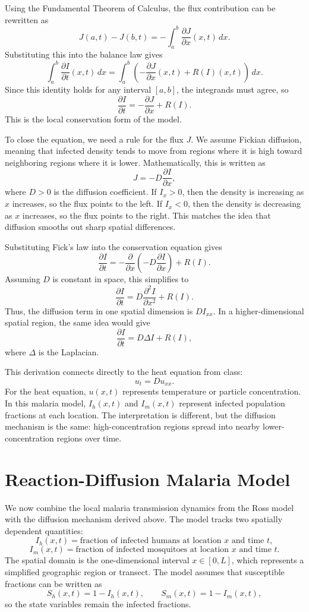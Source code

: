 \documentclass[12pt]{article}
\begin{document}
Using the Fundamental Theorem of Calculus, the flux contribution can be rewritten as
\[
J(a,t)-J(b,t)
=
-\int_a^b \frac{\partial J}{\partial x}(x,t)\,dx.
\]
Substituting this into the balance law gives
\[
\int_a^b \frac{\partial I}{\partial t}(x,t)\,dx
=
\int_a^b \left(-\frac{\partial J}{\partial x}(x,t)+R(I)(x,t)\right)\,dx.
\]
Since this identity holds for any interval \([a,b]\), the integrands must agree, so
\[
\frac{\partial I}{\partial t}
=
-\frac{\partial J}{\partial x}+R(I).
\]
This is the local conservation form of the model.

To close the equation, we need a rule for the flux \(J\). We assume Fickian diffusion, meaning that infected density tends to move from regions where it is high toward neighboring regions where it is lower. Mathematically, this is written as
\[
J=-D\frac{\partial I}{\partial x},
\]
where \(D>0\) is the diffusion coefficient. If \(I_x>0\), then the density is increasing as \(x\) increases, so the flux points to the left. If \(I_x<0\), then the density is decreasing as \(x\) increases, so the flux points to the right. This matches the idea that diffusion smooths out sharp spatial differences.

Substituting Fick's law into the conservation equation gives
\[
\frac{\partial I}{\partial t}
=
-\frac{\partial}{\partial x}\left(-D\frac{\partial I}{\partial x}\right)+R(I).
\]
Assuming \(D\) is constant in space, this simplifies to
\[
\frac{\partial I}{\partial t}
=
D\frac{\partial^2 I}{\partial x^2}+R(I).
\]
Thus, the diffusion term in one spatial dimension is \(D I_{xx}\). In a higher-dimensional spatial region, the same idea would give
\[
\frac{\partial I}{\partial t}
=
D\Delta I+R(I),
\]
where \(\Delta\) is the Laplacian.

This derivation connects directly to the heat equation from class:
\[
u_t=Du_{xx}.
\]
For the heat equation, \(u(x,t)\) represents temperature or particle concentration. In this malaria model, \(I_h(x,t)\) and \(I_m(x,t)\) represent infected population fractions at each location. The interpretation is different, but the diffusion mechanism is the same: high-concentration regions spread into nearby lower-concentration regions over time.

\section{Reaction-Diffusion Malaria Model}

We now combine the local malaria transmission dynamics from the Ross model with the diffusion mechanism derived above. The model tracks two spatially dependent quantities:
\[
I_h(x,t) = \text{fraction of infected humans at location } x \text{ and time } t,
\]
\[
I_m(x,t) = \text{fraction of infected mosquitoes at location } x \text{ and time } t.
\]
The spatial domain is the one-dimensional interval \(x\in[0,L]\), which represents a simplified geographic region or transect. The model assumes that susceptible fractions can be written as
\[
S_h(x,t)=1-I_h(x,t),
\qquad
S_m(x,t)=1-I_m(x,t),
\]
so the state variables remain the infected fractions.
\end{document}
